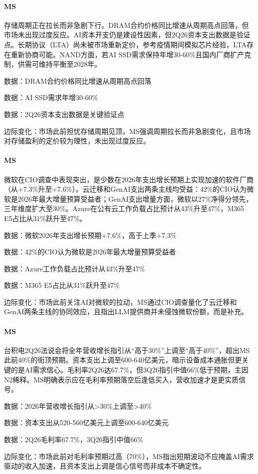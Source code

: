 \documentclass[11pt]{ctexart}
\begin{document}
\paragraph{MS} 存储周期正在拉长而非急剧下行。DRAM合约价格同比增速从周期高点回落，但市场未出现过度反应。AI资本开支仍是建设性因素，但2Q26资本支出数据是验证点。长期协议（LTA）尚未被市场重新定价，参考疫情期间模拟芯片经验，LTA存在重新协商可能。NAND方面，若AI SSD需求保持年增30-60\%且国内厂商扩产克制，供需可维持平衡至2028年。
{\small\color{refgray}数据：DRAM合约价格同比增速从周期高点回落\par}
{\small\color{refgray}数据：AI SSD需求年增30-60\%\par}
{\small\color{refgray}数据：2Q26资本支出数据是关键验证点\par}
{\small\color{refgray}边际变化：市场此前担忧存储周期见顶，MS强调周期拉长而非急剧变化，且市场对存储盈利的定价较为理性，未出现过度反应。\par}
\paragraph{MS} 微软在CIO调查中表现突出，是少数在2026年支出增长预期上实现加速的软件厂商（从+7.3\%升至+7.6\%）。云迁移和GenAI支出两条主线均受益：42\%的CIO认为微软是2026年最大增量预算受益者；GenAI支出增量方面，微软以27\%净得分领先，三年维度扩大至30\%。Azure在公有云工作负载占比预计从43\%升至47\%，M365 E5占比从31\%跃升至47\%。
{\small\color{refgray}数据：微软2026年支出增长预期+7.6\%，高于上季+7.3\%\par}
{\small\color{refgray}数据：42\%的CIO认为微软是2026年最大增量预算受益者\par}
{\small\color{refgray}数据：Azure工作负载占比预计从43\%升至47\%\par}
{\small\color{refgray}数据：M365 E5占比从31\%跃升至47\%\par}
{\small\color{refgray}边际变化：市场此前关注AI对微软的拉动，MS通过CIO调查量化了云迁移和GenAI两条主线的协同效应，且指出LLM提供商并未侵蚀微软份额，而是补充。\par}
\paragraph{MS} 台积电2Q26法说会将全年营收增长指引从“高于30\%”上调至“高于40\%”，超出MS此前40\%的街顶预期。资本支出上调至600-640亿美元，暗示设备成本通胀但更关键的是AI需求信心。毛利率2Q26达67.7\%，但3Q26指引中值66\%低于预期，主因N2稀释。MS明确表示应在毛利率预期落空后逢低买入，营收加速才是更实质信号。
{\small\color{refgray}数据：2026年营收增长指引从>30\%上调至>40\%\par}
{\small\color{refgray}数据：资本支出从520-560亿美元上调至600-640亿美元\par}
{\small\color{refgray}数据：2Q26毛利率67.7\%，3Q26指引中值66\%\par}
{\small\color{refgray}边际变化：市场此前对毛利率预期过高（70\%），MS指出短期波动不应掩盖AI需求驱动的收入加速，且资本支出上调是信心信号而非成本不确定性。\par}
\end{document}
